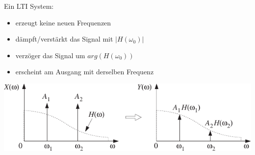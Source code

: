 	\begin{minipage}{0.55\textwidth}
	Ein LTI System:\\[-0.35cm]
		\begin{itemize}
		\item erzeugt keine neuen Frequenzen\\[-0.35cm]
		\item dämpft/verstärkt das Signal mit $|H(\omega_0)|$\\[-0.35cm]
		\item verzöger das Signal um $arg(H(\omega_0))$\\[-0.35cm]
		\item erscheint am Ausgang mit derselben Frequenz\\[0.2cm]
		\end{itemize}

	\end{minipage}
	\begin{minipage}{0.45\textwidth}
		\includegraphics[width = 1\textwidth]{pic/frequenzgang.pdf}\\[1cm]
	\end{minipage}
\newpage
